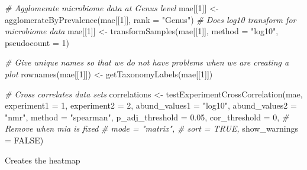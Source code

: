 \documentclass[
]{book}
\newenvironment{Shaded}{\begin{snugshade}}{\end{snugshade}}
\newcommand{\AttributeTok}[1]{\textcolor[rgb]{0.77,0.63,0.00}{#1}}
\newcommand{\CommentTok}[1]{\textcolor[rgb]{0.56,0.35,0.01}{\textit{#1}}}
\newcommand{\ConstantTok}[1]{\textcolor[rgb]{0.00,0.00,0.00}{#1}}
\newcommand{\DecValTok}[1]{\textcolor[rgb]{0.00,0.00,0.81}{#1}}
\newcommand{\FloatTok}[1]{\textcolor[rgb]{0.00,0.00,0.81}{#1}}
\newcommand{\FunctionTok}[1]{\textcolor[rgb]{0.00,0.00,0.00}{#1}}
\newcommand{\NormalTok}[1]{#1}
\newcommand{\OtherTok}[1]{\textcolor[rgb]{0.56,0.35,0.01}{#1}}
\newcommand{\StringTok}[1]{\textcolor[rgb]{0.31,0.60,0.02}{#1}}
\begin{document}
\begin{Shaded}
\begin{Highlighting}[]
\CommentTok{\# Agglomerate microbiome data at Genus level}
\NormalTok{mae[[}\DecValTok{1}\NormalTok{]] }\OtherTok{\textless{}{-}} \FunctionTok{agglomerateByPrevalence}\NormalTok{(mae[[}\DecValTok{1}\NormalTok{]], }\AttributeTok{rank =} \StringTok{"Genus"}\NormalTok{)}
\CommentTok{\# Does log10 transform for microbiome data}
\NormalTok{mae[[}\DecValTok{1}\NormalTok{]] }\OtherTok{\textless{}{-}} \FunctionTok{transformSamples}\NormalTok{(mae[[}\DecValTok{1}\NormalTok{]], }\AttributeTok{method =} \StringTok{"log10"}\NormalTok{, }\AttributeTok{pseudocount =} \DecValTok{1}\NormalTok{)}

\CommentTok{\# Give unique names so that we do not have problems when we are creating a plot}
\FunctionTok{rownames}\NormalTok{(mae[[}\DecValTok{1}\NormalTok{]]) }\OtherTok{\textless{}{-}} \FunctionTok{getTaxonomyLabels}\NormalTok{(mae[[}\DecValTok{1}\NormalTok{]])}

\CommentTok{\# Cross correlates data sets}
\NormalTok{correlations }\OtherTok{\textless{}{-}} \FunctionTok{testExperimentCrossCorrelation}\NormalTok{(mae, }
                                               \AttributeTok{experiment1 =} \DecValTok{1}\NormalTok{,}
                                               \AttributeTok{experiment2 =} \DecValTok{2}\NormalTok{,}
                                               \AttributeTok{abund\_values1 =} \StringTok{"log10"}\NormalTok{, }
                                               \AttributeTok{abund\_values2 =} \StringTok{"nmr"}\NormalTok{,}
                                               \AttributeTok{method =} \StringTok{"spearman"}\NormalTok{, }
                                               \AttributeTok{p\_adj\_threshold =} \FloatTok{0.05}\NormalTok{,}
                                               \AttributeTok{cor\_threshold =} \DecValTok{0}\NormalTok{,}
                                               \CommentTok{\# Remove when mia is fixed}
                                               \CommentTok{\# mode = "matrix",}
                                               \CommentTok{\# sort = TRUE,}
                                               \AttributeTok{show\_warnings =} \ConstantTok{FALSE}\NormalTok{)}
\end{Highlighting}
\end{Shaded}

Creates the heatmap
\end{document}
